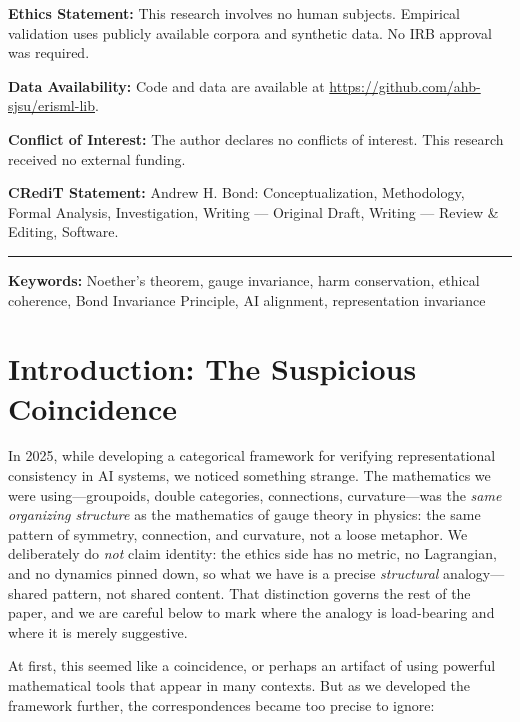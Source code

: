\documentclass[12pt,letterpaper]{article}
\theoremstyle{definition}
\theoremstyle{remark}
\begin{document}
\begin{titlepage}
\noindent\textbf{Ethics Statement:} This research involves no human subjects. Empirical validation uses publicly available corpora and synthetic data. No IRB approval was required.

\noindent\textbf{Data Availability:} Code and data are available at \url{https://github.com/ahb-sjsu/erisml-lib}.

\noindent\textbf{Conflict of Interest:} The author declares no conflicts of interest. This research received no external funding.

\noindent\textbf{CRediT Statement:} Andrew H. Bond: Conceptualization, Methodology, Formal Analysis, Investigation, Writing --- Original Draft, Writing --- Review \& Editing, Software.
\noindent\rule{\linewidth}{0.4pt}
\normalsize

\end{titlepage}

\noindent\textbf{Keywords:} Noether's theorem, gauge invariance, harm conservation, ethical coherence, Bond Invariance Principle, AI alignment, representation invariance

\newpage
\tableofcontents
\newpage

\section{Introduction: The Suspicious Coincidence}

In 2025, while developing a categorical framework for verifying representational consistency in AI systems, we noticed something strange. The mathematics we were using---groupoids, double categories, connections, curvature---was the \textit{same organizing structure} as the mathematics of gauge theory in physics: the same pattern of symmetry, connection, and curvature, not a loose metaphor. We deliberately do \emph{not} claim identity: the ethics side has no metric, no Lagrangian, and no dynamics pinned down, so what we have is a precise \emph{structural} analogy---shared pattern, not shared content. That distinction governs the rest of the paper, and we are careful below to mark where the analogy is load-bearing and where it is merely suggestive.

At first, this seemed like a coincidence, or perhaps an artifact of using powerful mathematical tools that appear in many contexts. But as we developed the framework further, the correspondences became too precise to ignore:
\end{document}
